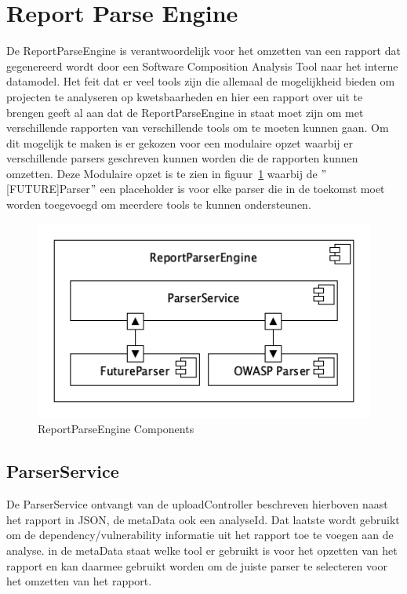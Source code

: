 \newpage
\section{Report Parse Engine}\label{sec:report-parse-engine}
De ReportParseEngine is verantwoordelijk voor het omzetten van een rapport dat gegenereerd wordt door een Software Composition Analysis Tool naar het interne datamodel. Het feit dat er veel tools zijn die allemaal de mogelijkheid bieden om projecten te analyseren op kwetsbaarheden en hier een rapport over uit te brengen geeft al aan dat de ReportParseEngine in staat moet zijn om met verschillende rapporten van verschillende tools om te moeten kunnen gaan. Om dit mogelijk te maken is er gekozen voor een modulaire opzet waarbij er verschillende parsers geschreven kunnen worden die de rapporten kunnen omzetten. Deze Modulaire opzet is te zien in figuur~\ref{fig:ReportParseComponents} waarbij de $"$[FUTURE]Parser$"$ een placeholder is voor elke parser die in de toekomst moet worden toegevoegd om meerdere tools te kunnen ondersteunen.
\begin{figure}[bth]
    \myfloatalign
    \includegraphics[width=12cm]{gfx/umlet/exports/ReportParserComponents}
    \caption{ReportParseEngine Components}
    \label{fig:ReportParseComponents}
\end{figure}


\subsection{ParserService}\label{subsec:reportservice}
De ParserService ontvangt van de uploadController beschreven hierboven naast het rapport in JSON, de metaData ook een analyseId. Dat laatste wordt gebruikt om de dependency/vulnerability informatie uit het rapport toe te voegen aan de analyse. in de metaData staat welke tool er gebruikt is voor het opzetten van het rapport en kan daarmee gebruikt worden om de juiste parser te selecteren voor het omzetten van het rapport.

